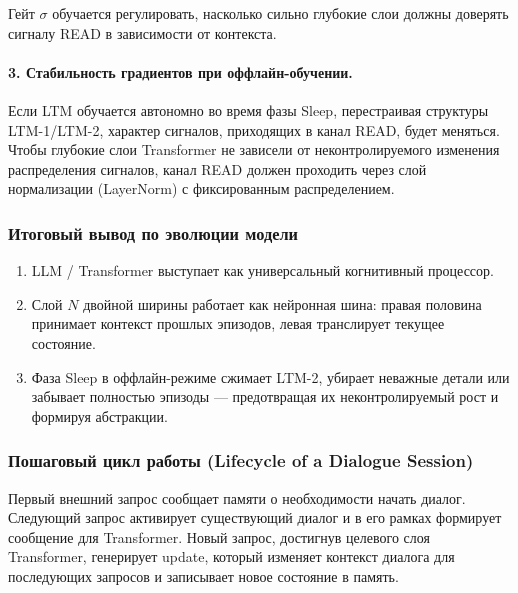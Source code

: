 \documentclass[11pt,a4paper]{article}
\begin{document}
Гейт $\sigma$ обучается регулировать, насколько сильно глубокие слои должны доверять сигналу READ в зависимости от контекста.

\paragraph{3. Стабильность градиентов при оффлайн-обучении.}
Если LTM обучается автономно во время фазы Sleep, перестраивая структуры LTM-1/LTM-2, характер сигналов, приходящих в канал READ, будет меняться. Чтобы глубокие слои Transformer не зависели от неконтролируемого изменения распределения сигналов, канал READ должен проходить через слой нормализации (LayerNorm) с фиксированным распределением.

\subsubsection*{Итоговый вывод по эволюции модели}

\begin{enumerate}
    \item LLM / Transformer выступает как универсальный когнитивный процессор.
    \item Слой $N$ двойной ширины работает как нейронная шина: правая половина принимает контекст прошлых эпизодов, левая транслирует текущее состояние.
    \item Фаза Sleep в оффлайн-режиме сжимает LTM-2, убирает неважные детали или забывает полностью эпизоды — предотвращая их неконтролируемый рост и формируя абстракции.
\end{enumerate}

\subsubsection*{Пошаговый цикл работы (Lifecycle of a Dialogue Session)}

Первый внешний запрос сообщает памяти о необходимости начать диалог. Следующий запрос активирует существующий диалог и в его рамках формирует сообщение для Transformer. Новый запрос, достигнув целевого слоя Transformer, генерирует update, который изменяет контекст диалога для последующих запросов и записывает новое состояние в память.
\end{document}
